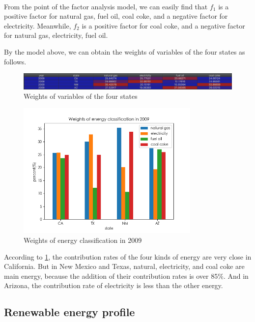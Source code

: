 \documentclass[a4paper,11pt]{article}
\begin{document}
\textrm{\\}
\par From the point of the factor analysis model, we can easily find that $f_1$ is a positive factor for natural gas, fuel oil, coal coke, and a negative factor for electricity. Meanwhile, $f_2$ is a positive factor for coal coke, and a negative factor for natural gas, electricity, fuel oil. 
\par By the model above, we can obtain the weights of variables of the four states as follows.
\begin{figure}[!hptb] 
    \centering 
    \includegraphics[width=1.0\textwidth]{./Pic/weights.jpg}
    \caption{Weights of variables of the four states}
\end{figure}
\begin{figure}[!hptb] 
    \centering 
    \includegraphics[width=0.8\textwidth]{./Pic/1-1.png}
    \caption{Weights of energy classification in 2009}
    \label{fit:1-1}
\end{figure}
\par According to \ref{fit:1-1}, the contribution rates of the four kinds of energy are very close in California. But in New Mexico and Texas, natural, electricity, and coal coke are main energy, because the addition of their contribution rates is over 85\%. And in Arizona, the contribution rate of electricity is less than the other energy. 


\subsection{Renewable energy profile}
\end{document}
